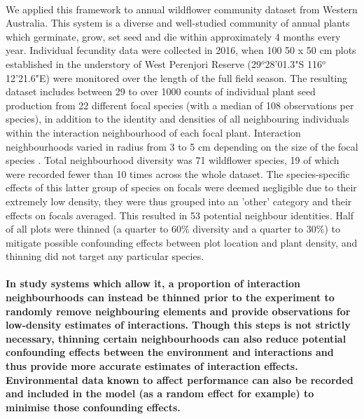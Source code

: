 \documentclass[a4,12pt]{article}
\begin{document}
        \paragraph{}
        We applied this framework to annual wildflower community dataset from Western Australia. This system is a diverse and well-studied community of annual plants which germinate, grow, set seed and die within approximately 4 months every year. Individual fecundity data were collected in 2016, when 100 50 x 50 cm plots established in the understory of West Perenjori Reserve (29$^o$28'01.3"S 116$^o$12'21.6"E) were monitored over the length of the full field season. The resulting dataset includes between 29 to over 1000 counts of individual plant seed production from 22 different focal species (with a median of 108 observations per species), in addition to the identity and densities of all neighbouring individuals within the interaction neighbourhood of each focal plant. Interaction neighbourhoods varied in radius from 3 to 5 cm depending on the size of the focal species \parencite{Martyn2020}. Total neighbourhood diversity was 71 wildflower species, 19 of which were recorded fewer than 10 times across the whole dataset. The species-specific effects of this latter group of species on focals were deemed negligible due to their extremely low density, they were thus grouped into an 'other' category and their effects on focals averaged. This resulted in 53 potential neighbour identities. Half of all plots were thinned (a quarter to 60\% diversity and a quarter to 30\%) to mitigate possible confounding effects between plot location and plant density, and thinning did not target any particular species. 

        \paragraph{}
    \textbf{In study systems which allow it, a proportion of interaction neighbourhoods can instead be thinned prior to the experiment to randomly remove neighbouring elements and provide observations for low-density estimates of interactions. Though this steps is not strictly necessary, thinning certain neighbourhoods can also reduce potential confounding effects between the environment and interactions and thus provide more accurate estimates of interaction effects. Environmental data known to affect performance can also be recorded and included in the model (as a random effect for example) to minimise those confounding effects.}
\end{document}
